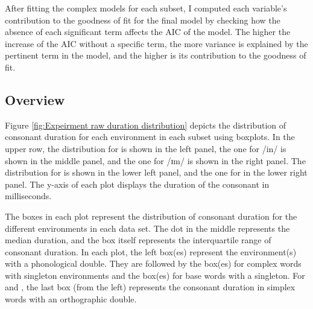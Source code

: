 After fitting the complex models for each subset, I computed each variable's contribution to the goodness of fit for the final model by checking how the absence of each significant term affects the AIC of the model. The higher the increase of the AIC without a specific term, the more variance is explained by the pertinent term in the model, and the higher is its contribution to the goodness of fit.







\subsection{Overview}
	
Figure \ref{fig:Expeirment raw duration distribution} depicts the distribution of consonant duration for each environment in each subset using boxplots. In the upper row, the distribution for  is shown in the left panel, the one for /in/ is shown in the middle panel, and the one for /ɪm/ is shown in the right panel. The distribution for  is shown in the lower left panel, and the one for  in the lower right panel.
The y-axis of each plot displays the duration of the consonant in milliseconds. 

The boxes in each plot represent the distribution of consonant duration for the different environments in each data set. The dot in the middle represents the median duration, and the box itself represents the interquartile range of consonant duration. 
In each plot, the left box(es) represent the environment(s) with a phonological double. They are followed by the box(es) for  complex words with singleton environments and the box(es) for base words with a singleton. For  and , the last box (from the left) represents the consonant duration in simplex words with an orthographic double.




